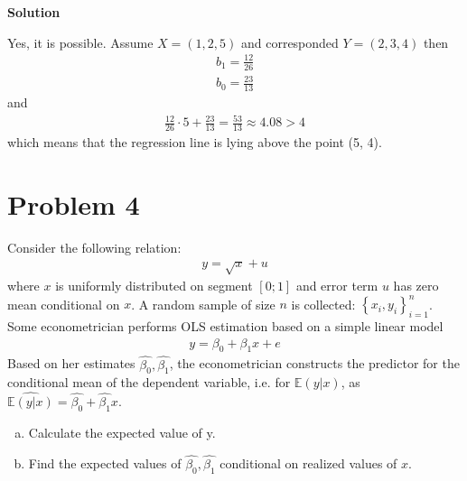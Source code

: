 \documentclass[a4paper]{article}
\newcommand{\expect}{\mathbb{E}}
\begin{document}
 
 \textbf{Solution}
 
 
 Yes, it is possible. Assume $X = (1, 2, 5)$ and corresponded $Y = (2, 3, 4)$ then
 \begin{align*}
 b_1 = \frac{12}{26}\\
 b_0 = \frac{23}{13}
 \end{align*}
 and
 \begin{align*}
 \frac{12}{26} \cdot 5 + \frac{23}{13} = \frac{53}{13} \approx 4.08 > 4
 \end{align*}
 which means that the regression line is lying above the point (5, 4).
 
 
 \section*{Problem 4}
  Consider the following relation:
\begin{align*}
y = \sqrt{x} + u
\end{align*}
 where $x$ is uniformly distributed on segment $[0; 1]$ and error term $u$ has zero mean
 conditional on $x$. A random sample of size $n$ is collected: $\left\{x_i, y_i\right\}_{i=1}^n$. Some econometrician
 performs OLS estimation based on a simple linear model 
 \begin{align*}
	y = \beta_0 + \beta_1x + e
\end{align*}
 Based on her estimates $\hat{\beta_0}, \hat{\beta_1}$, the econometrician constructs the predictor for the conditional mean of the dependent variable, i.e. for $\expect(y|x)$, as $\widehat{\expect(y|x)} = \hat{\beta_0} + \hat{\beta_1} x$.
 \begin{enumerate}[a.]
 \item Calculate the expected value of y.
 \item Find the expected values of $\hat{\beta_0}, \hat{\beta_1}$ conditional on realized values of $x$.
 \end{enumerate}
\end{document}
